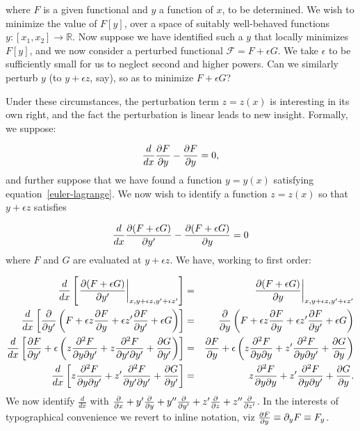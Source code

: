 \documentclass[pdflatex,sn-mathphys-num]{sn-jnl}%
\theoremstyle{thmstyleone}%
\theoremstyle{thmstyletwo}%
\theoremstyle{thmstylethree}%
\begin{document}
\noindent where $F$ is a given functional and $y$ a function of $x$,
to be determined.  We wish to minimize the value of $F[y]$, over a
space of suitably well-behaved functions
$y\colon\left[x_1,x_2\right]\longrightarrow\mathbb{R}$.  Now suppose
we have identified such a $y$ that locally minimizes $F[y]$, and we
now consider a perturbed functional $\mathcal{F}=F+\epsilon G$.  We
take $\epsilon$ to be sufficiently small for us to neglect second and
higher powers.  Can we similarly perturb $y$ (to $y+\epsilon z$, say),
so as to minimize $F+\epsilon G$?

Under these circumstances, the perturbation term $z=z(x)$ is
interesting in its own right, and the fact the perturbation is linear
leads to new insight.  Formally, we suppose:

\begin{equation}\label{euler-lagrange}
  \frac{d}{dx}\frac{\partial{F}}{\partial{y}}-\frac{\partial{F}}{\partial{y}} = 0,
\end{equation}
%
and further suppose that we have found a function $y=y(x)$ satisfying
equation~\ref{euler-lagrange}.  We now wish to identify a function
$z=z(x)$ so that $y+\epsilon z$ satisfies

\begin{equation}
  \frac{d}{dx}\frac{\partial{(F+\epsilon G)}}{\partial{y'}}-\frac{\partial{(F+\epsilon G)}}{\partial{y}} = 0
\end{equation}
%
where $F$ and $G$ are evaluated at $y+\epsilon z$.  We have, working
to first order:

\begin{eqnarray}
\frac{d}{dx}\left[\left.\frac{\partial{(F+\epsilon G)}}{\partial{y'}}\right|_{x,y+\epsilon z,y'+\epsilon z'}\right]
&=& \left.\frac{\partial{(F+\epsilon G)}}{\partial{y}}\right|_{x,y+\epsilon z,y'+\epsilon z'}\nonumber\\
\frac{d}{dx}\left[\frac{\partial{}}{\partial{y'}}\left(F + \epsilon z\frac{\partial{F}}{\partial{y}} + \epsilon z'\frac{\partial{F}}{\partial{y'}}+\epsilon G\right)\right]
&=& \frac{\partial{}}{\partial{y}}\left(F + \epsilon z\frac{\partial{F}}{\partial{y}} + \epsilon z'\frac{\partial{F}}{\partial{y'}}+\epsilon G\right)\nonumber\\
\frac{d}{dx}\left[\frac{\partial{F}}{\partial{y'}} + \epsilon\left(z\frac{\partial^2{F}}{\partial{y}\partial{y'}} + z\frac{\partial^2{F}}{\partial{y'}\partial{y'}} + \frac{\partial{G}}{\partial{y'}}\right)\right]
&=& \frac{\partial{F}}{\partial{y}} + \epsilon\left(z\frac{\partial^2{F}}{\partial{y}\partial{y}} + z'\frac{\partial^2{F}}{\partial{y}\partial{y'}} + \frac{\partial{G}}{\partial{y}}\right)\nonumber\\
\frac{d}{dx}\left[z\frac{\partial^2{F}}{\partial{y}\partial{y'}} + z'\frac{\partial^2{F}}{\partial{y'}\partial{y'}} + \frac{\partial{G}}{\partial{y'}}\right]
&=& z\frac{\partial^2{F}}{\partial{y}\partial{y}} + z'\frac{\partial^2{F}}{\partial{y}\partial{y'}} + \frac{\partial{G}}{\partial{y}}.
\end{eqnarray}
%
We now identify $\frac{d}{dx}$ with $\frac{\partial{}}{\partial{x}} + y'\frac{\partial{}}{\partial{y}} +
y''\frac{\partial{}}{\partial{y'}} + z'\frac{\partial{}}{\partial{z}} + z''\frac{\partial{}}{\partial{z'}}$.  In the interests of
typographical convenience we revert to inline notation, viz
$\frac{\partial{F}}{\partial{y}}\equiv\partial_yF\equiv F_y$.
\end{document}
